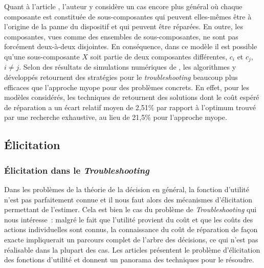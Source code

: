 \documentclass[a4paper,11pt]{article}
\theoremstyle{plain}
\theoremstyle{definition}
\begin{document}
Quant à l'article \cite{Langseth_2003}, l'auteur y considère un cas encore plus général où chaque composante est constituée de sous-composantes qui peuvent elles-mêmes être à l'origine de la panne du dispositif et qui peuvent être réparées. En outre, les composantes, vues comme des ensembles de sous-composantes, ne sont pas forcément deux-à-deux disjointes. En conséquence, dans ce modèle il est possible qu'une sous-composante $X$ soit partie de deux composantes différentes, $c_i$ et $c_j$, $i \neq j$. Selon des résultats de simulations numériques de \cite{Langseth_2003}, les algorithmes y développés retournent des stratégies pour le \emph{troubleshooting} beaucoup plus efficaces que l'approche myope pour des problèmes concrets. En effet, pour les modèles considérés, les techniques de \cite{Jensen_2001, Langseth_2003} retournent des solutions dont le coût espéré de réparation a un écart relatif moyen de 2,51\% par rapport à l'optimum trouvé par une recherche exhaustive, au lieu de 21,5\% pour l'approche myope.

\subsection{Élicitation}
\label{SecElicitation}

\subsubsection{Élicitation dans le \emph{Troubleshooting}}
\label{SecElicitationTroubleshooting}

Dans les problèmes de la théorie de la décision en général, la fonction d'utilité n'est pas parfaitement connue et il nous faut alors des mécanismes d'élicitation permettant de l'estimer. Cela est bien le cas du problème de \emph{Troubleshooting} qui nous intéresse~: malgré le fait que l'utilité provient du coût et que les coûts des actions individuelles sont connus, la connaissance du coût de réparation de façon exacte impliquerait un parcours complet de l'arbre des décisions, ce qui n'est pas réalisable dans la plupart des cas. Les articles \cite{Braziunas_2008, braziunas_local_2005} présentent le problème d'élicitation des fonctions d'utilité et donnent un panorama des techniques pour le résoudre.
\end{document}
